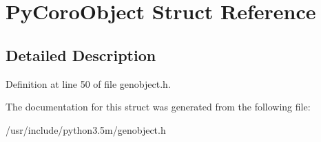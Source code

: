 \hypertarget{structPyCoroObject}{}\section{Py\+Coro\+Object Struct Reference}
\label{structPyCoroObject}


\subsection{Detailed Description}


Definition at line 50 of file genobject.\+h.



The documentation for this struct was generated from the following file\+:\begin{DoxyCompactItemize}
\item 
/usr/include/python3.\+5m/genobject.\+h\end{DoxyCompactItemize}
